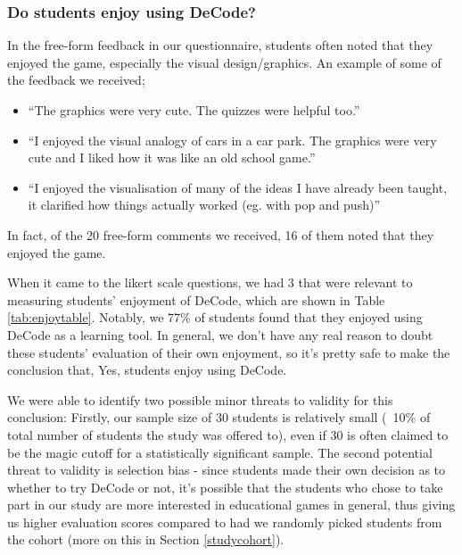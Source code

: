 \documentclass[10pt]{article}
\begin{document}
\subsubsection{Do students enjoy using DeCode?}
In the free-form feedback in our questionnaire, students often noted that they enjoyed the game, especially the visual design/graphics. An example of some of the feedback we received;
\begin{itemize}
  \item ``The graphics were very cute. The quizzes were helpful too.''
  \item ``I enjoyed the visual analogy of cars in a car park. The graphics were very cute and I liked how it was like an old school game.''
  \item ``I enjoyed the visualisation of many of the ideas I have already been taught, it clarified how things actually worked (eg. with pop and push)''
\end{itemize}
In fact, of the 20 free-form comments we received, 16 of them noted that they enjoyed the game.\par
When it came to the likert scale questions, we had 3 that were relevant to measuring students' enjoyment of DeCode, which are shown in Table \ref{tab:enjoytable}. Notably, we 77\% of students found that they enjoyed using DeCode as a learning tool. In general, we don't have any real reason to doubt these students' evaluation of their own enjoyment, so it's pretty safe to make the conclusion that, Yes, students enjoy using DeCode.\par
We were able to identify two possible minor threats to validity for this conclusion: Firstly, our sample size of 30 students is relatively small (~10\% of total number of students the study was offered to), even if 30 is often claimed to be the magic cutoff for a statistically significant sample. The second potential threat to validity is selection bias - since students made their own decision as to whether to try DeCode or not, it's possible that the students who chose to take part in our study are more interested in educational games in general, thus giving us higher evaluation scores compared to had we randomly picked students from the cohort (more on this in Section \ref{studycohort}).
\end{document}
